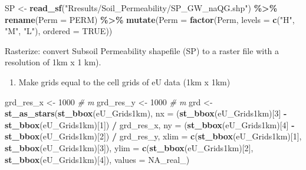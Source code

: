 \documentclass[
  12pt,
]{article}
\newenvironment{Shaded}{\begin{snugshade}}{\end{snugshade}}
\newcommand{\CommentTok}[1]{\textcolor[rgb]{0.56,0.35,0.01}{\textit{#1}}}
\newcommand{\DataTypeTok}[1]{\textcolor[rgb]{0.13,0.29,0.53}{#1}}
\newcommand{\DecValTok}[1]{\textcolor[rgb]{0.00,0.00,0.81}{#1}}
\newcommand{\KeywordTok}[1]{\textcolor[rgb]{0.13,0.29,0.53}{\textbf{#1}}}
\newcommand{\NormalTok}[1]{#1}
\newcommand{\OperatorTok}[1]{\textcolor[rgb]{0.81,0.36,0.00}{\textbf{#1}}}
\newcommand{\OtherTok}[1]{\textcolor[rgb]{0.56,0.35,0.01}{#1}}
\newcommand{\StringTok}[1]{\textcolor[rgb]{0.31,0.60,0.02}{#1}}
\providecommand{\tightlist}{%
  \setlength{\itemsep}{0pt}\setlength{\parskip}{0pt}}
\begin{document}
\begin{Shaded}
\begin{Highlighting}[]
\NormalTok{  SP \textless{}{-}}\StringTok{ }\KeywordTok{read\_sf}\NormalTok{(}\StringTok{"Rresults/Soil\_Permeability/SP\_GW\_naQG.shp"}\NormalTok{) }\OperatorTok{\%\textgreater{}\%}
\StringTok{    }\KeywordTok{rename}\NormalTok{(}\DataTypeTok{Perm =}\NormalTok{ PERM) }\OperatorTok{\%\textgreater{}\%}
\StringTok{    }\KeywordTok{mutate}\NormalTok{(}\DataTypeTok{Perm =} \KeywordTok{factor}\NormalTok{(Perm,}
                         \DataTypeTok{levels =} \KeywordTok{c}\NormalTok{(}\StringTok{"H"}\NormalTok{, }\StringTok{"M"}\NormalTok{, }\StringTok{"L"}\NormalTok{),}
                         \DataTypeTok{ordered =} \OtherTok{TRUE}\NormalTok{)) }
\end{Highlighting}
\end{Shaded}

Rasterize: convert Subsoil Permeability shapefile (SP) to a raster file
with a resolution of 1km x 1 km).

\begin{enumerate}
\def\labelenumi{\alph{enumi})}
\tightlist
\item
  Make grids equal to the cell grids of eU data (1km x 1km)
\end{enumerate}

\begin{Shaded}
\begin{Highlighting}[]
\NormalTok{  grd\_res\_x \textless{}{-}}\StringTok{ }\DecValTok{1000} \CommentTok{\# m}
\NormalTok{  grd\_res\_y \textless{}{-}}\StringTok{ }\DecValTok{1000} \CommentTok{\# m}
\NormalTok{  grd \textless{}{-}}\StringTok{ }\KeywordTok{st\_as\_stars}\NormalTok{(}\KeywordTok{st\_bbox}\NormalTok{(eU\_Grids1km),}
     \DataTypeTok{nx =}\NormalTok{ (}\KeywordTok{st\_bbox}\NormalTok{(eU\_Grids1km)[}\DecValTok{3}\NormalTok{] }\OperatorTok{{-}}\StringTok{ }\KeywordTok{st\_bbox}\NormalTok{(eU\_Grids1km)[}\DecValTok{1}\NormalTok{]) }\OperatorTok{/}\StringTok{ }\NormalTok{grd\_res\_x,}
     \DataTypeTok{ny =}\NormalTok{ (}\KeywordTok{st\_bbox}\NormalTok{(eU\_Grids1km)[}\DecValTok{4}\NormalTok{] }\OperatorTok{{-}}\StringTok{ }\KeywordTok{st\_bbox}\NormalTok{(eU\_Grids1km)[}\DecValTok{2}\NormalTok{]) }\OperatorTok{/}\StringTok{ }\NormalTok{grd\_res\_y,}
     \DataTypeTok{xlim =} \KeywordTok{c}\NormalTok{(}\KeywordTok{st\_bbox}\NormalTok{(eU\_Grids1km)[}\DecValTok{1}\NormalTok{], }\KeywordTok{st\_bbox}\NormalTok{(eU\_Grids1km)[}\DecValTok{3}\NormalTok{]),}
     \DataTypeTok{ylim =} \KeywordTok{c}\NormalTok{(}\KeywordTok{st\_bbox}\NormalTok{(eU\_Grids1km)[}\DecValTok{2}\NormalTok{], }\KeywordTok{st\_bbox}\NormalTok{(eU\_Grids1km)[}\DecValTok{4}\NormalTok{]),}
     \DataTypeTok{values =} \OtherTok{NA\_real\_}\NormalTok{)}
\end{Highlighting}
\end{Shaded}
\end{document}
